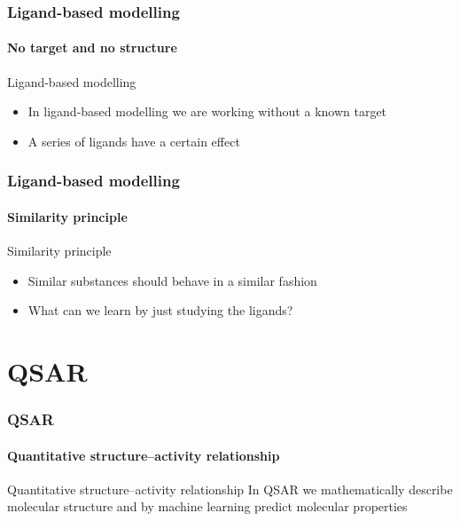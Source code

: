 \documentclass[aspectratio=169]{beamer}
\begin{document}
    
    \begin{frame}
        \frametitle{Ligand-based modelling}
        \framesubtitle{No target and no structure}

        \begin{block}{Ligand-based modelling}
            \begin{itemize}
                \item In ligand-based modelling we are working without a known target
                \item A series of ligands have a certain effect
            \end{itemize}
        \end{block}
    \end{frame}
    
    \begin{frame}
        \frametitle{Ligand-based modelling}
        \framesubtitle{Similarity principle}

        \begin{block}{Similarity principle}
            \begin{itemize}
                \item Similar substances should behave in a similar fashion
                \item What can we learn by just studying the ligands?
            \end{itemize}
        \end{block}
    \end{frame}

\section{QSAR}

    \begin{frame}
        \frametitle{QSAR}
        \framesubtitle{Quantitative structure–activity relationship}

        \begin{block}{Quantitative structure–activity relationship}
            In QSAR we mathematically describe molecular structure and by machine learning predict molecular properties
        \end{block}
    \end{frame}
    
\end{document}
